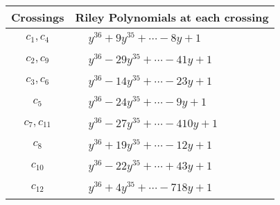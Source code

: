 \documentclass[1p]{elsarticle_modified}
\theoremstyle{definition}
\begin{document}
\begin{tabular}{m{50pt}|m{274pt}}
Crossings & \hspace{64pt}Riley Polynomials at each crossing \\
\hline $$\begin{aligned}c_{1},c_{4}\end{aligned}$$&$\begin{aligned}
&y^{36}+9 y^{35}+\cdots-8 y+1
\end{aligned}$\\
\hline $$\begin{aligned}c_{2},c_{9}\end{aligned}$$&$\begin{aligned}
&y^{36}-29 y^{35}+\cdots-41 y+1
\end{aligned}$\\
\hline $$\begin{aligned}c_{3},c_{6}\end{aligned}$$&$\begin{aligned}
&y^{36}-14 y^{35}+\cdots-23 y+1
\end{aligned}$\\
\hline $$\begin{aligned}c_{5}\end{aligned}$$&$\begin{aligned}
&y^{36}-24 y^{35}+\cdots-9 y+1
\end{aligned}$\\
\hline $$\begin{aligned}c_{7},c_{11}\end{aligned}$$&$\begin{aligned}
&y^{36}-27 y^{35}+\cdots-410 y+1
\end{aligned}$\\
\hline $$\begin{aligned}c_{8}\end{aligned}$$&$\begin{aligned}
&y^{36}+19 y^{35}+\cdots-12 y+1
\end{aligned}$\\
\hline $$\begin{aligned}c_{10}\end{aligned}$$&$\begin{aligned}
&y^{36}-22 y^{35}+\cdots+43 y+1
\end{aligned}$\\
\hline $$\begin{aligned}c_{12}\end{aligned}$$&$\begin{aligned}
&y^{36}+4 y^{35}+\cdots-718 y+1
\end{aligned}$\\
\hline
\end{tabular}\\~\\
\end{document}
